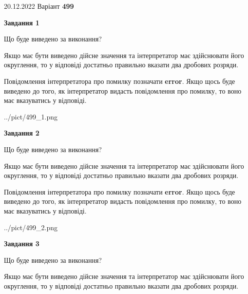 \documentclass[12pt, ukrainian]{article}
\begin{document}
{20.12.2022 Варіант \No \textbf { 499 }\par}
{
\begin {Large}

{\begin {center}\textbf{Завдання 1}\end {center}}\par
Що буде виведено за виконання? \par

Якщо має бути виведено дійсне значення та інтерпретатор має здійснювати його округлення, 
то у відповіді достатньо правильно вказати два дробових розряди.

Повідомлення інтерпретатора про помилку позначати \textbf{error}.
Якщо щось буде виведено до того, як інтерпретатор видасть повідомлення про помилку, 
то воно має вказуватись у відповіді. \par

\begin{center}
	{../pict/499_1.png}
\end{center}
\newpage

{\begin {center}\textbf{Завдання 2}\end {center}}\par
Що буде виведено за виконання? \par

Якщо має бути виведено дійсне значення та інтерпретатор має здійснювати його округлення, 
то у відповіді достатньо правильно вказати два дробових розряди.

Повідомлення інтерпретатора про помилку позначати \textbf{error}.
Якщо щось буде виведено до того, як інтерпретатор видасть повідомлення про помилку, 
то воно має вказуватись у відповіді. \par

\begin{center}
	{../pict/499_2.png}
\end{center}
\newpage

{\begin {center}\textbf{Завдання 3}\end {center}}\par
Що буде виведено за виконання? \par

Якщо має бути виведено дійсне значення та інтерпретатор має здійснювати його округлення, 
то у відповіді достатньо правильно вказати два дробових розряди.


\end{Large}}
\end{document}
